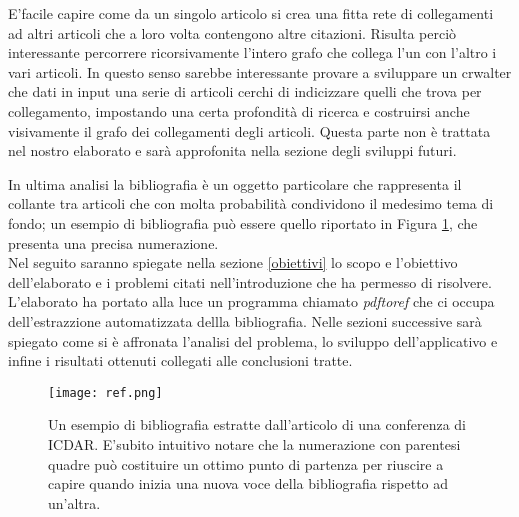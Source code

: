 E'facile capire come da un singolo articolo si crea una fitta rete di collegamenti ad altri articoli che a loro volta contengono altre citazioni. Risulta perciò interessante percorrere ricorsivamente l'intero grafo che collega l'un con l'altro i vari articoli. In questo senso sarebbe interessante provare a sviluppare un crwalter che dati in input una serie di articoli cerchi di indicizzare quelli che trova per collegamento, impostando una certa profondità di ricerca e costruirsi anche visivamente il grafo dei collegamenti degli articoli. Questa parte non è trattata nel nostro elaborato e sarà approfonita nella sezione degli sviluppi futuri.

In ultima analisi la bibliografia è un oggetto particolare che rappresenta il collante tra articoli che con molta probabilità condividono il medesimo tema di fondo; un esempio di bibliografia può essere quello riportato in Figura \ref{fig:ref-examples}, che presenta una precisa numerazione.\\

Nel seguito saranno spiegate nella sezione \ref{obiettivi} lo scopo e l'obiettivo dell'elaborato e i problemi citati nell'introduzione che ha permesso di risolvere. L'elaborato ha portato alla luce  un programma chiamato \textit{pdftoref} che ci occupa dell'estrazzione automatizzata dellla bibliografia. Nelle sezioni successive sarà spiegato come si è affronata l'analisi del problema, lo sviluppo dell'applicativo e infine i risultati ottenuti collegati alle conclusioni tratte.


\begin{figure}[htb]
\begin{center}
\texttt{[image: ref.png]}
\end{center}
\caption[Un esempio di bibliografia]{Un esempio di bibliografia estratte dall'articolo di una conferenza di ICDAR. E'subito intuitivo notare che la numerazione con parentesi quadre può costituire un ottimo punto di partenza per riuscire a capire quando inizia una nuova voce della bibliografia rispetto ad un'altra.}
\label{fig:ref-examples}
\end{figure}



